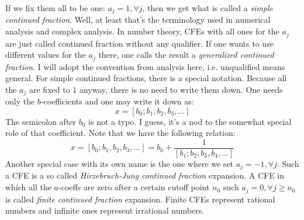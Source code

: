 If we fix them all to be one: $a_j = 1, \forall j$, then we get what is called a \emph{simple continued fraction}. Well, at least that's the terminology used in numerical analysis and complex analysis. In number theory, CFEs with all ones for the $a_j$ are just called continued fraction without any qualifier. If one wants to use different values for the $a_j$ there, one calls the result a \emph{generalized continued fraction}. I will adopt the convention from analysis here, i.e. unqualified means general. For simple continued fractions, there is a special notation. Because all the $a_j$ are fixed to $1$ anyway, there is no need to write them down. One needs only the $b$-coefficients and one may write it down as:
\begin{equation}
x = [b_0; b_1, b_2, b_3, \ldots]
\end{equation}
The semicolon after $b_0$ is not a typo. I guess, it's a nod to the somewhat special role of that coefficient. Note that we have the following relation:
\begin{equation}
x = [b_0; b_1, b_2, b_3, \ldots] = b_0 + \frac{1}{[b_1; b_2, b_3, b_4, \ldots]}
\end{equation}
Another special case with its own name is the one where we set  $a_j = -1, \forall j$. Such a CFE is a so called \emph{Hirzebruch-Jung continued fraction} expansion. A CFE in which all the $a$-coeffs are zero after a certain cutoff point $n_0$ such $a_j = 0, \forall j \geq n_0$ is called \emph{finite continued fraction} expansion. Finite CFEs represent rational numbers and infinite ones represent irrational numbers.







